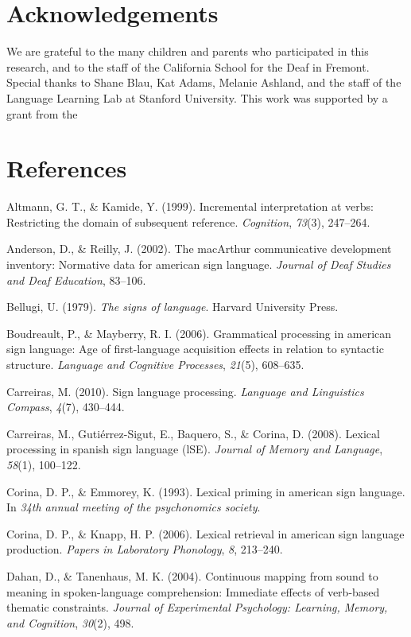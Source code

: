 \documentclass[12pt,]{article}
\begin{document}
\section{Acknowledgements}\label{acknowledgements}

We are grateful to the many children and parents who participated in
this research, and to the staff of the California School for the Deaf in
Fremont. Special thanks to Shane Blau, Kat Adams, Melanie Ashland, and
the staff of the Language Learning Lab at Stanford University. This work
was supported by a grant from the

\newpage 

\section*{References}\label{references}

Altmann, G. T., \& Kamide, Y. (1999). Incremental interpretation at
verbs: Restricting the domain of subsequent reference. \emph{Cognition},
\emph{73}(3), 247--264.

Anderson, D., \& Reilly, J. (2002). The macArthur communicative
development inventory: Normative data for american sign language.
\emph{Journal of Deaf Studies and Deaf Education}, 83--106.

Bellugi, U. (1979). \emph{The signs of language}. Harvard University
Press.

Boudreault, P., \& Mayberry, R. I. (2006). Grammatical processing in
american sign language: Age of first-language acquisition effects in
relation to syntactic structure. \emph{Language and Cognitive
Processes}, \emph{21}(5), 608--635.

Carreiras, M. (2010). Sign language processing. \emph{Language and
Linguistics Compass}, \emph{4}(7), 430--444.

Carreiras, M., Guti{é}rrez-Sigut, E., Baquero, S., \& Corina, D. (2008).
Lexical processing in spanish sign language (lSE). \emph{Journal of
Memory and Language}, \emph{58}(1), 100--122.

Corina, D. P., \& Emmorey, K. (1993). Lexical priming in american sign
language. In \emph{34th annual meeting of the psychonomics society}.

Corina, D. P., \& Knapp, H. P. (2006). Lexical retrieval in american
sign language production. \emph{Papers in Laboratory Phonology},
\emph{8}, 213--240.

Dahan, D., \& Tanenhaus, M. K. (2004). Continuous mapping from sound to
meaning in spoken-language comprehension: Immediate effects of
verb-based thematic constraints. \emph{Journal of Experimental
Psychology: Learning, Memory, and Cognition}, \emph{30}(2), 498.
\end{document}
